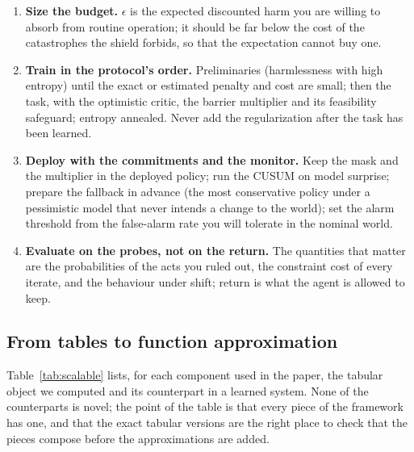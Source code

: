 \begin{enumerate}[leftmargin=1.6em,itemsep=2pt]
      Check that the symmetric-penalty condition \eqref{eq:symmetric} is \emph{not} satisfied for your power critic (it is identically unsatisfied if the critic is one-sided).
\item \textbf{Size the budget.} $\epsilon$ is the expected discounted harm you are willing to absorb from routine operation; it should be far below the cost of the catastrophes the shield forbids, so that the expectation cannot buy one.
\item \textbf{Train in the protocol's order.} Preliminaries (harmlessness with high entropy) until the exact or estimated penalty and cost are small; then the task, with the optimistic critic, the barrier multiplier and its feasibility safeguard; entropy annealed.
      Never add the regularization after the task has been learned.
\item \textbf{Deploy with the commitments and the monitor.} Keep the mask and the multiplier in the deployed policy; run the CUSUM on model surprise; prepare the fallback in advance (the most conservative policy under a pessimistic model that never intends a change to the world); set the alarm threshold from the false-alarm rate you will tolerate in the nominal world.
\item \textbf{Evaluate on the probes, not on the return.} The quantities that matter are the probabilities of the acts you ruled out, the constraint cost of every iterate, and the behaviour under shift; return is what the agent is allowed to keep.
\end{enumerate}

\subsection{From tables to function approximation}
Table~\ref{tab:scalable} lists, for each component used in the paper, the tabular object we computed and its counterpart in a learned system.
None of the counterparts is novel; the point of the table is that every piece of the framework has one, and that the exact tabular versions are the right place to check that the pieces compose before the approximations are added.


